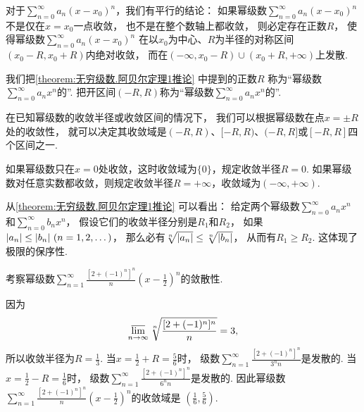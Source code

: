对于\(\sum_{n=0}^\infty a_n (x-x_0)^n\)，我们有平行的结论：
如果幂级数\(\sum_{n=0}^\infty a_n (x-x_0)^n\)不是仅在\(x=x_0\)一点收敛，
也不是在整个数轴上都收敛，
则必定存在正数\(R\)，
使得幂级数\(\sum_{n=0}^\infty a_n (x-x_0)^n\)
在以\(x_0\)为中心、\(R\)为半径的对称区间\((x_0-R,x_0+R)\)内绝对收敛，
而在\((-\infty,x_0-R)\cup(x_0+R,+\infty)\)上发散.

我们把\cref{theorem:无穷级数.阿贝尔定理1推论} 中提到的正数\(R\)
称为“幂级数\(\sum_{n=0}^\infty a_n x^n\)的”.
把开区间\((-R,R)\)称为“幂级数\(\sum_{n=0}^\infty a_n x^n\)的”.

在已知幂级数的收敛半径或收敛区间的情况下，
我们可以根据幂级数在点\(x = \pm R\)处的收敛性，
就可以决定其收敛域是\((-R,R)\)、\([-R,R)\)、\((-R,R]\)或\([-R,R]\)四个区间之一.

如果幂级数只在\(x=0\)处收敛，这时收敛域为\(\{0\}\)，规定收敛半径\(R=0\).
如果幂级数对任意实数都收敛，则规定收敛半径\(R=+\infty\)，收敛域为\((-\infty,+\infty)\).

从\cref{theorem:无穷级数.阿贝尔定理1推论} 可以看出：
给定两个幂级数\(\sum_{n=0}^\infty a_n x^n\)和\(\sum_{n=0}^\infty b_n x^n\)，
假设它们的收敛半径分别是\(R_1\)和\(R_2\)，
如果\(\abs{a_n} \leq \abs{b_n}\ (n=1,2,\dotsc)\)，
那么必有\(\sqrt[n]{\abs{a_n}} \leq \sqrt[n]{\abs{b_n}}\)，
从而有\(R_1 \geq R_2\).
这体现了极限的保序性.

\begin{example}
考察幂级数\(\sum_{n=1}^\infty \frac{[2+(-1)^n]^n}{n} \left(x-\frac12\right)^n\)的敛散性.
\begin{solution}
因为\begin{equation*}
	\varlimsup_{n\to\infty} \sqrt[n]{\frac{[2+(-1)^n]^n}n} = 3,
\end{equation*}
所以收敛半径为\(R=\frac13\).
当\(x=\frac12+R=\frac56\)时，
级数\(\sum_{n=1}^\infty \frac{[2+(-1)^n]^n}{3^n n}\)是发散的.
当\(x=\frac12-R=\frac16\)时，
级数\(\sum_{n=1}^\infty \frac{[2+(-1)^n]^n}{6^n n}\)是发散的.
因此幂级数\(\sum_{n=1}^\infty \frac{[2+(-1)^n]^n}{n} \left(x-\frac12\right)^n\)的收敛域是
\(\left(\frac16,\frac56\right)\).
\end{solution}
\end{example}

